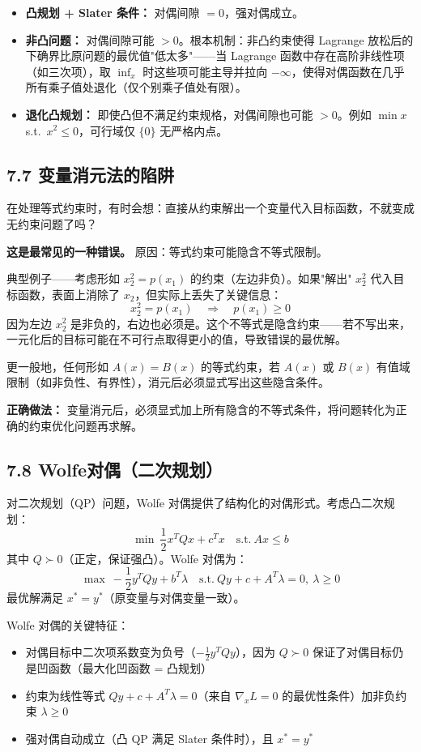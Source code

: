 \begin{itemize}
  \item \textbf{凸规划 + Slater 条件：} 对偶间隙 $=0$，强对偶成立。
  \item \textbf{非凸问题：} 对偶间隙可能 $>0$。根本机制：非凸约束使得 Lagrange 放松后的下确界比原问题的最优值"低太多"——当 Lagrange 函数中存在高阶非线性项（如三次项），取 $\inf_x$ 时这些项可能主导并拉向 $-\infty$，使得对偶函数在几乎所有乘子值处退化（仅个别乘子值处有限）。
  \item \textbf{退化凸规划：} 即使凸但不满足约束规格，对偶间隙也可能 $>0$。例如 $\min x$ s.t.\ $x^2\le0$，可行域仅 $\{0\}$ 无严格内点。
\end{itemize}

\subsection{7.7 变量消元法的陷阱}

在处理等式约束时，有时会想：直接从约束解出一个变量代入目标函数，不就变成无约束问题了吗？

\textbf{这是最常见的一种错误。} 原因：等式约束可能隐含不等式限制。

典型例子——考虑形如 $x_2^2 = p(x_1)$ 的约束（左边非负）。如果"解出" $x_2^2$ 代入目标函数，表面上消除了 $x_2$，但实际上丢失了关键信息：
\[
x_2^2 = p(x_1) \quad\Rightarrow\quad p(x_1) \ge 0
\]
因为左边 $x_2^2$ 是非负的，右边也必须是。这个不等式是隐含约束——若不写出来，一元化后的目标可能在不可行点取得更小的值，导致错误的最优解。

更一般地，任何形如 $A(x) = B(x)$ 的等式约束，若 $A(x)$ 或 $B(x)$ 有值域限制（如非负性、有界性），消元后必须显式写出这些隐含条件。

\textbf{正确做法：} 变量消元后，必须显式加上所有隐含的不等式条件，将问题转化为正确的约束优化问题再求解。

\subsection{7.8 Wolfe对偶（二次规划）}

对二次规划（QP）问题，Wolfe 对偶提供了结构化的对偶形式。考虑凸二次规划：
\[
\min\ \frac{1}{2}x^T Q x + c^T x \quad \text{s.t.}\ A x \le b
\]
其中 $Q \succ 0$（正定，保证强凸）。Wolfe 对偶为：
\[
\max\ -\frac{1}{2}y^T Q y + b^T \lambda
\quad \text{s.t.}\ Q y + c + A^T \lambda = 0,\ \lambda \ge 0
\]
最优解满足 $x^* = y^*$（原变量与对偶变量一致）。

Wolfe 对偶的关键特征：
\begin{itemize}
  \item 对偶目标中二次项系数变为负号（$-\frac{1}{2}y^T Q y$），因为 $Q \succ 0$ 保证了对偶目标仍是凹函数（最大化凹函数 = 凸规划）
  \item 约束为线性等式 $Q y + c + A^T \lambda = 0$（来自 $\nabla_x L = 0$ 的最优性条件）加非负约束 $\lambda \ge 0$
  \item 强对偶自动成立（凸 QP 满足 Slater 条件时），且 $x^* = y^*$
\end{itemize}

